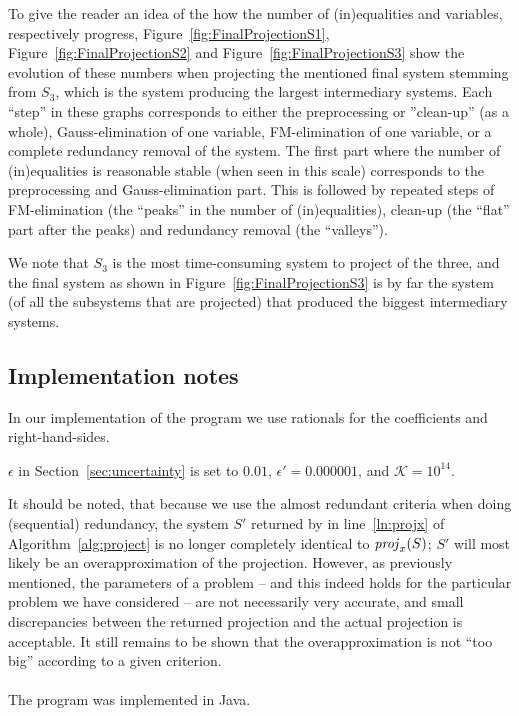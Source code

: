 To give the reader an idea of the how the number of (in)equalities and variables, respectively progress, Figure~\ref{fig:FinalProjectionS1}, Figure~\ref{fig:FinalProjectionS2} and Figure~\ref{fig:FinalProjectionS3} show the evolution of these numbers when projecting the mentioned final system stemming from $S_3$, which is the system producing the largest intermediary systems. Each ``step'' in these graphs corresponds to either the preprocessing or ''clean-up'' (as a whole), Gauss-elimination of one variable, FM-elimination of one variable, or a complete redundancy removal of the system. The first part where the number of (in)equalities is reasonable stable (when seen in this scale) corresponds to the preprocessing and Gauss-elimination part. 
This is followed by repeated steps of FM-elimination (the ``peaks'' in the number of (in)equalities), clean-up (the ``flat'' part after the peaks) and redundancy removal (the ``valleys'').

We note that $S_3$ is the most time-consuming system to project of the three, and the final system as shown in Figure~\ref{fig:FinalProjectionS3} is by far the system (of all the subsystems that are projected) that produced the biggest intermediary systems.  

\subsection{Implementation notes}
{In our implementation of the program we use rationals for the coefficients and right-hand-sides}.

$\epsilon$ in Section~\ref{sec:uncertainty} is set to $0.01$, $\epsilon' = 0.000001$, and $\mathcal{K} = 10^{14}$.

{It should be noted, that because we use the almost redundant criteria when doing (sequential) redundancy, the system $S'$ returned by  in line~\ref{ln:projx} of Algorithm~\ref{alg:project} is no longer completely identical to $\mathit{proj}_x(S)$; $S'$ will most likely be an overapproximation of the projection. However, as previously mentioned, the parameters of a problem -- and this indeed holds for the particular problem we have considered -- are not necessarily very accurate, and small discrepancies between the returned projection and the actual projection is acceptable. It still remains to be shown that the overapproximation is not ``too big'' according to a given criterion.}
\\
\\
The program was implemented in Java.

